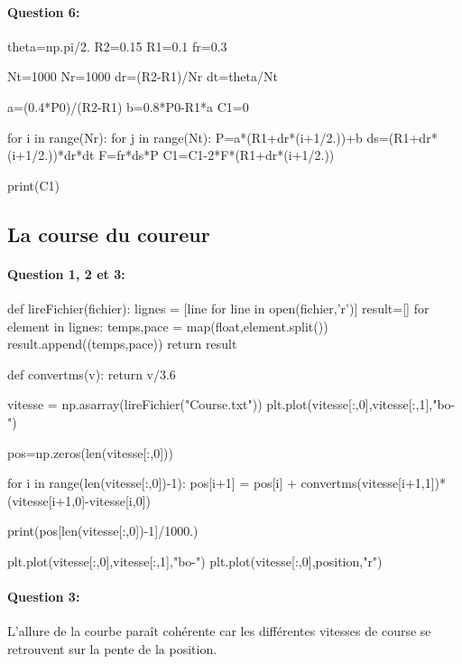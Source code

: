 \paragraph{Question 6:} 

\begin{verbatimtab}[3]

theta=np.pi/2.
R2=0.15
R1=0.1
fr=0.3

Nt=1000
Nr=1000
dr=(R2-R1)/Nr
dt=theta/Nt

a=(0.4*P0)/(R2-R1)
b=0.8*P0-R1*a
C1=0

for i in range(Nr):
     for j in range(Nt):
         P=a*(R1+dr*(i+1/2.))+b
         ds=(R1+dr*(i+1/2.))*dr*dt
         F=fr*ds*P
         C1=C1-2*F*(R1+dr*(i+1/2.))  
    
print(C1)
\end{verbatimtab}

\subsection{La course du coureur}

\paragraph{Question 1, 2 et 3:}

\begin{verbatimtab}[3]

def lireFichier(fichier):
    lignes = [line for line in open(fichier,'r')]
    result=[]
    for element in lignes:
        temps,pace = map(float,element.split())
        result.append((temps,pace))
    return result

def convertms(v):
    return v/3.6

vitesse = np.asarray(lireFichier("Course.txt"))
plt.plot(vitesse[:,0],vitesse[:,1],"bo-")

pos=np.zeros(len(vitesse[:,0]))

for i in range(len(vitesse[:,0])-1):
    pos[i+1] = pos[i] + convertms(vitesse[i+1,1])*(vitesse[i+1,0]-vitesse[i,0])    
    
print(pos[len(vitesse[:,0])-1]/1000.)

plt.plot(vitesse[:,0],vitesse[:,1],"bo-")
plt.plot(vitesse[:,0],position,"r")
\end{verbatimtab}

\paragraph{Question 3:} L'allure de la courbe paraît cohérente car les différentes vitesses de course se retrouvent sur la pente de la position.


